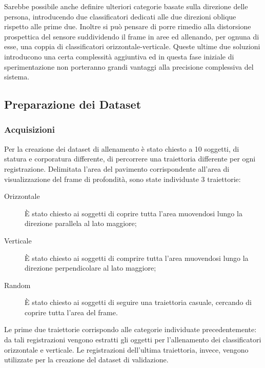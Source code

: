                 Sarebbe possibile anche definire ulteriori categorie basate sulla direzione delle persona, introducendo due classificatori dedicati alle due direzioni oblique rispetto alle prime due.
                Inoltre si può pensare di porre rimedio alla distorsione prospettica del sensore suddividendo il frame in aree ed allenando, per ognuna di esse, una coppia di classificatori orizzontale-verticale.
                Queste ultime due soluzioni introducono una certa complessità aggiuntiva ed in questa fase iniziale di sperimentazione non porteranno grandi vantaggi alla precisione complessiva del sistema.

        \subsection{Preparazione dei Dataset}
        \label{sub:datasets_setup}
            \subsubsection{Acquisizioni}
                Per la creazione dei dataset di allenamento è stato chiesto a 10 soggetti, di statura e corporatura differente, di percorrere una traiettoria differente per ogni registrazione.
                Delimitata l'area del pavimento corrispondente all'area di visualizzazione del frame di profondità, sono state individuate 3 traiettorie:
                \begin{description}
                    \item[Orizzontale] È stato chiesto ai soggetti di coprire tutta l'area muovendosi lungo la direzione parallela al lato maggiore;
                    \item[Verticale] È stato chiesto ai soggetti di comprire tutta l'area muovendosi lungo la direzione perpendicolare al lato maggiore;
                    \item[Random] È stato chiesto ai soggetti di seguire una traiettoria casuale, cercando di coprire tutta l'area del frame.
                \end{description}
                Le prime due traiettorie corrispondo alle categorie individuate precedentemente: da tali registrazioni vengono estratti gli oggetti per l'allenamento dei classificatori orizzontale e verticale.
                Le registrazioni dell'ultima traiettoria, invece, vengono utilizzate per la creazione del dataset di validazione.

